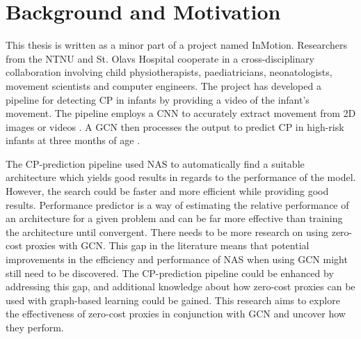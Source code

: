  \section{Background and Motivation}
This thesis is written as a minor part of a project named InMotion. Researchers from the \Gls{NTNU} and St. Olavs Hospital cooperate in a cross-disciplinary collaboration involving child physiotherapists, paediatricians, neonatologists, movement scientists and computer engineers. The project has developed a pipeline for detecting \Gls{CP} in infants by providing a video of the infant's movement. The pipeline employs a \Gls{CNN} to accurately extract movement from 2D images or videos \autocite{groos2021efficientpose}. A GCN then processes the output to predict CP in high-risk infants at three months of age \autocite{groos2022convolutional}. 

The CP-prediction pipeline used NAS to automatically find a suitable architecture which yields good results in regards to the performance of the model. However, the search could be faster and more efficient while providing good results. Performance predictor is a way of estimating the relative performance of an architecture for a given problem and can be far more effective than training the architecture until convergent. There needs to be more research on using zero-cost proxies with GCN. This gap in the literature means that potential improvements in the efficiency and performance of NAS when using GCN might still need to be discovered. The CP-prediction pipeline could be enhanced by addressing this gap, and additional knowledge about how zero-cost proxies can be used with graph-based learning could be gained. This research aims to explore the effectiveness of zero-cost proxies in conjunction with GCN and uncover how they perform. 